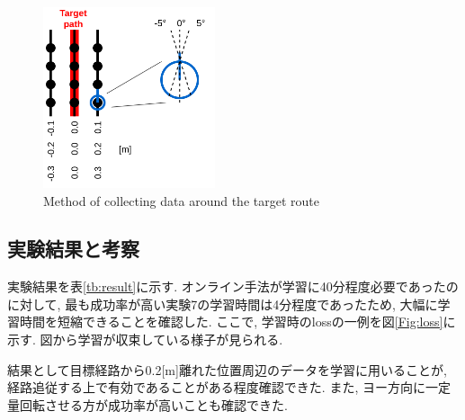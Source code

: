 \documentclass{ujarticle}
\begin{document}
\begin{figure}[h]
		\centering
		\includegraphics[width=0.45\textwidth]{img/collect2.png}
		\caption{Method of collecting data around the target route}
		\label{Fig:collect-data}
\end{figure}

\newpage
\subsection{実験結果と考察}
実験結果を表\ref{tb:result}に示す. オンライン手法が学習に40分程度必要であったのに対して, 最も成功率が高い実験7の学習時間は4分程度であったため, 大幅に学習時間を短縮できることを確認した. ここで, 学習時のlossの一例を図\ref{Fig:loss}に示す. 図から学習が収束している様子が見られる. 
\par 結果として目標経路から0.2[m]離れた位置周辺のデータを学習に用いることが, 経路追従する上で有効であることがある程度確認できた. また, ヨー方向に一定量回転させる方が成功率が高いことも確認できた. 


\end{document}
